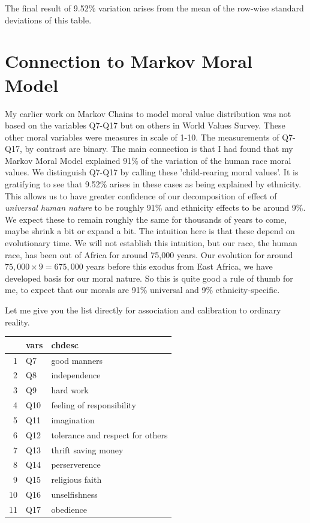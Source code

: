 \documentclass{amsart}
\begin{document}
The final result of 9.52\% variation arises from the mean of the row-wise standard deviations of this table.

\section{Connection to Markov Moral Model}

My earlier work on Markov Chains to model moral value distribution was not based on the variables Q7-Q17 but on others in World Values Survey.  These other moral variables were measures in scale of 1-10.  The measurements of Q7-Q17, by contrast are binary.  The main connection is that I had found that my Markov Moral Model explained 91\% of the variation of the human race moral values.  We distinguish Q7-Q17 by calling these 'child-rearing moral values'.   It is gratifying to see that 9.52\% arises in these cases as being explained by ethnicity.  This allows us to have greater confidence of our decomposition of effect of {\em universal human nature} to be roughly 91\% and ethnicity effects to be around 9\%.  We expect these to remain roughly the same for thousands of years to come, maybe shrink a bit or expand a bit.  The intuition here is that these depend on evolutionary time.  We will not establish this intuition, but our race, the human race, has been out of Africa for around 75,000 years.  Our evolution for around $75,000 \times 9 = 675,000$ years before this exodus from East Africa, we have developed basis for our moral nature.  So this is quite good a rule of thumb for me, to expect that our morals are 91\% universal and 9\% ethnicity-specific. 


Let me give you the list directly for association and calibration to ordinary reality.

\begin{table}[ht]
\centering
\begin{tabular}{rll}
  \hline
 & vars & chdesc \\ 
  \hline
1 & Q7 & good manners \\ 
  2 & Q8 & independence \\ 
  3 & Q9 & hard work \\ 
  4 & Q10 & feeling of responsibility \\ 
  5 & Q11 & imagination \\ 
  6 & Q12 & tolerance and respect for others \\ 
  7 & Q13 & thrift saving money \\ 
  8 & Q14 & perserverence \\ 
  9 & Q15 & religious faith \\ 
  10 & Q16 & unselfishness \\ 
  11 & Q17 & obedience \\ 
   \hline
\end{tabular}
\end{table}
\end{document}
